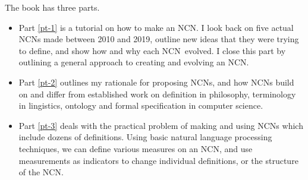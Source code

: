\documentclass[graybox,envcountchap,sectrefs]{svmono}
\newcommand{\ncn}{NCN}
\begin{document}
The book has three parts.
\begin{itemize}
  \item Part \ref{pt-1} is a tutorial on how to make an \ncn. I look back on five actual \ncn s made between 2010 and 2019, outline new ideas that they were trying to define, and show how and why each \ncn\ evolved. I close this part by outlining a general approach to creating and evolving an \ncn.
  \item Part \ref{pt-2} outlines my rationale for proposing \ncn s, and how \ncn s build on and differ from established work on definition in philosophy, terminology in lingistics, ontology and formal specification in computer science.
  \item Part \ref{pt-3} deals with the practical problem of making and using \ncn s which include dozens of definitions. Using basic natural language processing techniques, we can define various measures on an \ncn, and use measurements as indicators to change individual definitions, or the structure of the \ncn. 
\end{itemize}





\end{document}

